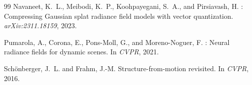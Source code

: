 \documentclass[12pt, a4paper]{article}
\begin{document}
\begin{thebibliography}{99}
Navaneet, K.~L., Meibodi, K.~P., Koohpayegani, S.~A., and Pirsiavash, H.
: Compressing {Gaussian} splat radiance field models with
vector quantization.
\newblock \emph{arXiv:2311.18159}, 2023.

Pumarola, A., Corona, E., Pons-Moll, G., and Moreno-Noguer, F.
: Neural radiance fields for dynamic scenes.
\newblock In \emph{CVPR}, 2021.

Sch\"{o}nberger, J.~L. and Frahm, J.-M.
\newblock Structure-from-motion revisited.
\newblock In \emph{CVPR}, 2016.

\end{thebibliography}
\end{document}
